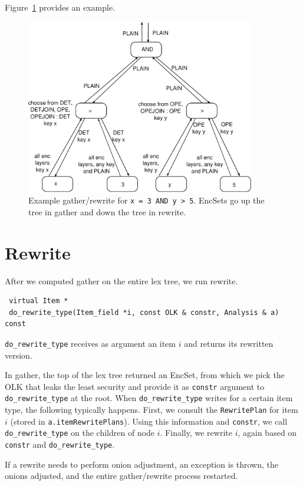 \documentclass[11pt]{article}
\begin{document}
Figure~\ref{fig:gather} provides an example.

\begin{figure}[t!]
\centering
\includegraphics[width=10cm]{fig/gather.pdf}
\caption{Example gather/rewrite for \texttt{x = 3 AND y > 5}. EncSets go up the
  tree in gather and down the tree in rewrite. }
\label{fig:gather}
\end{figure}

\section{Rewrite}

After we computed gather on the entire lex tree, we run rewrite. 

\begin{lstlisting}
 virtual Item *
 do_rewrite_type(Item_field *i, const OLK & constr, Analysis & a) const
\end{lstlisting}

\texttt{do\_rewrite\_type} receives as argument an item $i$ and returns its
rewritten version.

In gather, the top of the lex tree returned an EncSet, from which we pick the
OLK that leaks the least security and provide it as \texttt{constr} argument to
\texttt{do\_rewrite\_type} at the root. 
When \texttt{do\_rewrite\_type} writes for a certain item type, the following
typically happens. First, we consult the \texttt{RewritePlan} for item $i$ (stored in
\texttt{a.itemRewritePlans}). Using this information and \texttt{constr}, we
call  \texttt{do\_rewrite\_type} on the children of node $i$. Finally, we
rewrite $i$, again based on \texttt{constr} and \texttt{do\_rewrite\_type}.

If a rewrite needs to perform onion adjustment, an exception is thrown, the
onions adjusted, and the entire gather/rewrite process restarted.





\end{document}
